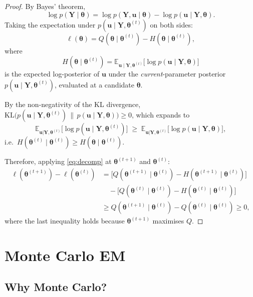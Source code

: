 \documentclass[11pt,a4paper]{article}
\theoremstyle{definition}
\theoremstyle{remark}
\newcommand{\E}{\mathbb{E}}
\newcommand{\bY}{\mathbf{Y}}
\newcommand{\bu}{\mathbf{u}}
\newcommand{\btheta}{\boldsymbol{\theta}}
\newcommand{\given}{\mid}
\begin{document}
\begin{proof}
By Bayes' theorem,
\[
  \log p(\bY \given \btheta)
    = \log p(\bY, \bu \given \btheta) - \log p(\bu \given \bY, \btheta).
\]
Taking the expectation under $p(\bu \given \bY, \btheta^{(t)})$ on both sides:
\begin{equation}
  \ell(\btheta) = Q(\btheta \given \btheta^{(t)}) - H(\btheta \given \btheta^{(t)}),
  \label{eq:decomp}
\end{equation}
where
\[
  H(\btheta \given \btheta^{(t)})
    = \E_{\bu \given \bY, \btheta^{(t)}}\!\bigl[\log p(\bu \given \bY, \btheta)\bigr]
\]
is the expected log-posterior of $\bu$ under the \emph{current}-parameter
posterior $p(\bu \given \bY, \btheta^{(t)})$, evaluated at a candidate $\btheta$.

By the non-negativity of the KL divergence,
$\mathrm{KL}\!\bigl(p(\bu \given \bY, \btheta^{(t)}) \,\|\, p(\bu \given \bY, \btheta)\bigr) \geq 0$,
which expands to
\[
  \E_{\bu|\bY,\btheta^{(t)}}\!\bigl[\log p(\bu \given \bY, \btheta^{(t)})\bigr]
  \;\geq\;
  \E_{\bu|\bY,\btheta^{(t)}}\!\bigl[\log p(\bu \given \bY, \btheta)\bigr],
\]
i.e.\ $H(\btheta^{(t)} \given \btheta^{(t)}) \geq H(\btheta \given \btheta^{(t)})$.

Therefore, applying \eqref{eq:decomp} at $\btheta^{(t+1)}$ and $\btheta^{(t)}$:
\begin{align*}
  \ell(\btheta^{(t+1)}) - \ell(\btheta^{(t)})
  &= \bigl[Q(\btheta^{(t+1)} \given \btheta^{(t)}) - H(\btheta^{(t+1)} \given \btheta^{(t)})\bigr]\\
  &\quad - \bigl[Q(\btheta^{(t)} \given \btheta^{(t)}) - H(\btheta^{(t)} \given \btheta^{(t)})\bigr]\\
  &\geq Q(\btheta^{(t+1)} \given \btheta^{(t)}) - Q(\btheta^{(t)} \given \btheta^{(t)}) \geq 0,
\end{align*}
where the last inequality holds because $\btheta^{(t+1)}$ maximises $Q$.
\end{proof}

\section{Monte Carlo EM}

\subsection{Why Monte Carlo?}
\end{document}
